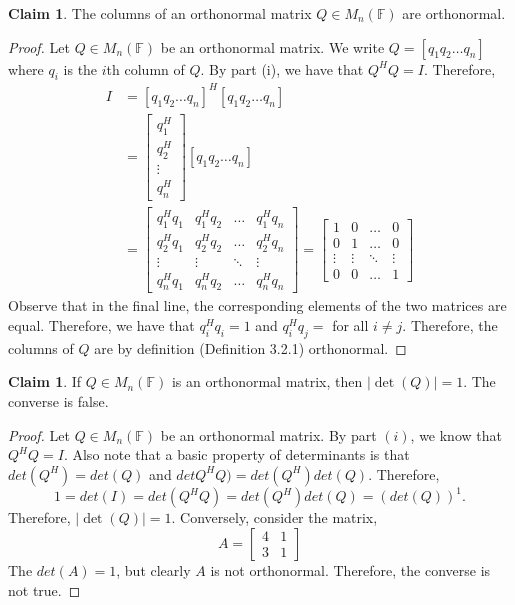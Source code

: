 \documentclass[letterpaper,12pt]{article}
\theoremstyle{definition}
\newtheorem{claim}[theorem]{Claim}
\begin{document}
\begin{claim}
	The columns of an orthonormal matrix $Q \in M_n(\mathbb{F})$ are orthonormal.
\end{claim}
\begin{proof}
	Let $Q \in M_n(\mathbb{F})$ be an orthonormal matrix. We write $Q = [q_1 q_2 \ldots q_n]$ where $q_i$ is the $i$th column of $Q$. By part (i), we have that $Q^HQ = I$. Therefore, 
	\begin{align*}
	I &= [q_1 q_2 \ldots q_n]^H [q_1 q_2 \ldots q_n] \\
	  &= 
	  \begin{bmatrix}
	  q_1^H \\
	  q_2^H \\
	  \vdots \\
	  q_n^H
	  \end{bmatrix}
	   [q_1 q_2 \ldots q_n] \\
	   &= 
	   \begin{bmatrix}
	   q^H_1 q_1 & q^H_1 q_2 & \hdots & q^H_1 q_n \\
	   q^H_2 q_1 & q^H_2 q_2 & \hdots & q^H_2 q_n \\
	   \vdots & \vdots & \ddots & \vdots \\
	   q^H_n q_1 & q^H_n q_2 & \hdots & q^H_n q_n
	   \end{bmatrix} =
	   \begin{bmatrix}
	   1 & 0 & \hdots & 0 \\
	   0 & 1 & \hdots & 0 \\
	   \vdots & \vdots & \ddots & \vdots \\
	   0 & 0 & \hdots & 1
	   \end{bmatrix}
	\end{align*}
	Observe that in the final line, the corresponding elements of the two matrices are equal. Therefore, we have that $q^H_i q_i = 1$ and $q^H_i q_j =$ for all $i \neq j$. Therefore, the columns of $Q$ are by definition (Definition 3.2.1) orthonormal.
\end{proof}

\begin{claim}
	If $Q \in M_n(\mathbb{F})$ is an orthonormal matrix, then $|\det(Q)| = 1$. The converse is false.
\end{claim}
\begin{proof}
	Let $Q \in M_n(\mathbb{F})$ be an orthonormal matrix. By part $(i)$, we know that $Q^HQ = I$.  Also note that a basic property of determinants is that $det(Q^H) = det(Q)$ and $detQ^HQ) = det(Q^H)det(Q)$. Therefore, 
	\begin{equation}
	1 = det(I) = det(Q^HQ) = det(Q^H)det(Q) = (det(Q))^1.
	\end{equation}
	Therefore, $|\det(Q)| = 1$. Conversely, consider the matrix, 
	\begin{equation}
	A = \begin{bmatrix}
	4 & 1 \\
	3 & 1
	\end{bmatrix}
	\end{equation}
	The $det(A) = 1$, but clearly $A$ is not orthonormal. Therefore, the converse is not true.
\end{proof}
\end{document}
